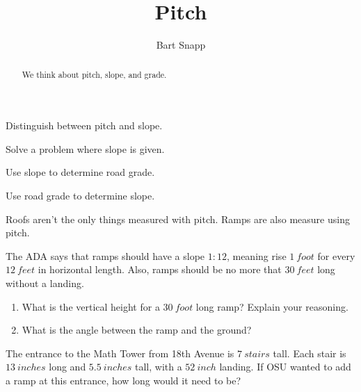 \documentclass[noauthor,nooutcomes,hints,handout]{../ximera}
\title{Pitch}
\author{Bart Snapp}
\begin{document}
\begin{abstract}
  We think about pitch, slope, and grade.
\end{abstract}
\maketitle

\begin{listOutcomes}
\item Distinguish between pitch and slope.
\item Solve a problem where slope is given.
\item Use slope to determine road grade.
\item Use road grade to determine slope.
\end{listOutcomes}


\begin{question}
  Roofs aren't the only things measured with pitch. Ramps are also measure using pitch. 
  
  The ADA says that ramps should have a slope $1:12$, meaning rise $1 \ foot$ for every $12\ feet$ in horizontal length. Also, ramps should be no more that $30\ feet$ long without a landing. 
  
  
\begin{enumerate}
 \item What is the vertical height for a $30\ foot$ long ramp? Explain your reasoning. 
 \item What is the angle between the ramp and the ground?
\end{enumerate}

\end{question}

\mynewpage

\begin{question}
The entrance to the Math Tower from 18th Avenue is $7\ stairs$ tall. Each stair is $13\ inches$ long and $5.5\ inches$ tall, with a $52\ inch$ landing. If OSU wanted to add a ramp at this entrance, how long would it need to be?

  \end{question}
\mynewpage
\end{document}
